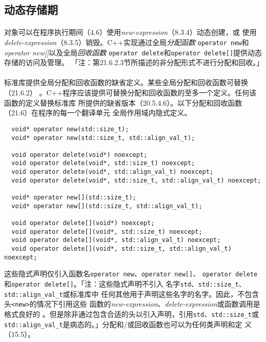 \subsection{动态存储期}
\paragraph{}
对象可以在程序执行期间（4.6）使用\textit{new-expression}（8.3.4）动态创建，或
使用\textit{delete-expression}（8.3.5）销毁。C++实现通过全局\textit{分配函数}
\texttt{operator new}和\textit{operator new[]}以及全局\textit{回收函数}
\texttt{operator delete}和\texttt{operator delete[]}提供动态存储的访问及管理。
「注：第21.6.2.3节所描述的非分配形式不进行分配和回收。」

\paragraph{}
标准库提供全局分配和回收函数的缺省定义。某些全局分配和回收函数可替换（21.6.2）
。C++程序应该提供可替换分配和回收函数的至多一个定义。任何该函数的定义替换标准库
所提供的缺省版本（20.5.4.6）。以下分配和回收函数（21.6）在程序的每一个翻译单元
全局作用域内隐式定义。
\begin{lstlisting}
  void* operator new(std::size_t);
  void* operator new(std::size_t, std::align_val_t);

  void operator delete(void*) noexcept;
  void operator delete(void*, std::size_t) noexcept;
  void operator delete(void*, std::align_val_t) noexcept;
  void operator delete(void*, std::size_t, std::align_val_t) noexcept;

  void* operator new[](std::size_t);
  void* operator new[](std::size_t, std::align_val_t);

  void operator delete[](void*) noexcept;
  void operator delete[](void*, std::size_t) noexcept;
  void operator delete[](void*, std::align_val_t) noexcept;
  void operator delete[](void*, std::size_t, std::align_val_t) noexcept;
\end{lstlisting}
这些隐式声明仅引入函数名\texttt{operator new}、\texttt{operator new[]}、
\texttt{operator delete}和\texttt{operator delete[]}。「注：这些隐式声明不引入
名字\texttt{std}、\texttt{std::size\_t}、\texttt{std::align\_val\_t}或标准库中
任何其他用于声明这些名字的名字。因此，不包含头\texttt{<new>}的情况下引用这些
函数的\textit{new-expression}、\textit{delete-expression}或函数调用是格式良好的
。但是除非通过包含合适的头以引入声明，引用\texttt{std}、\texttt{std::size\_t}或
\texttt{std::align\_val\_t}是病态的。」分配和/或回收函数也可以为任何类声明和定
义（15.5）。


